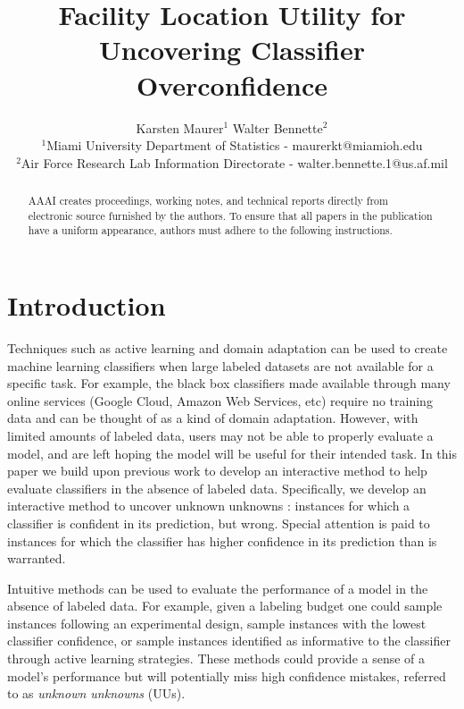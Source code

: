 \documentclass[letterpaper]{article} %
\begin{document}
%
\title{Facility Location Utility for Uncovering Classifier Overconfidence}
\author{Karsten Maurer$^1$ \hspace{.2in} Walter Bennette$^2$\\
$^1$Miami University Department of Statistics - maurerkt@miamioh.edu\\ 
$^2$Air Force Research Lab Information Directorate - walter.bennette.1@us.af.mil \\
}

\maketitle
\begin{abstract}
AAAI creates proceedings, working notes, and technical reports directly from electronic source furnished by the authors. To ensure that all papers in the publication have a uniform appearance, authors must adhere to the following instructions. 
\end{abstract}

\section{Introduction}

Techniques such as active learning \citep{Settles2010} and domain adaptation \citep{Patel2014} can be used to create machine learning classifiers when large labeled datasets are not available for a specific task.  For example, the black box classifiers made available through many online services (Google Cloud, Amazon Web Services, etc) require no training data and can be thought of as a kind of domain adaptation.  However, with limited amounts of labeled data, users may not be able to properly evaluate a model, and are left hoping the model will be useful for their intended task.  In this paper we build upon previous work to develop an interactive method to help evaluate classifiers in the absence of labeled data.  Specifically, we develop an interactive method to uncover unknown unknowns \citep{Attenberg2015}: instances for which a classifier is confident in its prediction, but wrong.  Special attention is paid to instances for which the classifier has higher confidence in its prediction than is warranted.

Intuitive methods can be used to evaluate the performance of a model in the absence of labeled data.  For example, given a labeling budget one could sample instances following an experimental design, sample instances with the lowest classifier confidence, or sample instances identified as informative to the classifier through active learning strategies.  These methods could provide a sense of a model's performance but will potentially miss high confidence mistakes, referred to as \textit{unknown unknowns} (UUs).     
\end{document}
